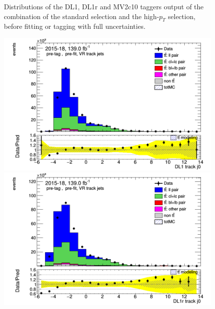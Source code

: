 \documentclass[letterpaper,12pt]{article}
\begin{document}
\begin{figure}[H]
\begin{minipage}[b]{.45\textwidth}
	\end{minipage}
	\caption{Distributions of the DL1, DL1r and MV2c10 
	taggers output of the combination 
	of the standard selection and the high-$p_T$ selection, 
	before fitting or tagging with full uncertainties.} \label{fig:taggers_PFlow}
\end{figure}

\begin{figure}[h]
	\begin{minipage}[b]{.45\textwidth}
	\centering
	\includegraphics[width=1\textwidth]{Oct_distributions/pretagNoRwDL1rwithhighpTVRJets_scaledall/DataMC__J0_DL1.png}
	\end{minipage}\hfill
	\begin{minipage}[b]{.45\textwidth}
	\centering
	\includegraphics[width=1\textwidth]{Oct_distributions/pretagNoRwDL1rwithhighpTVRJets_scaledall/DataMC__J0_DL1r.png}
	\end{minipage}\hfill
	\begin{minipage}[b]{.45\textwidth}

\end{minipage}
\end{figure}
\end{document}
